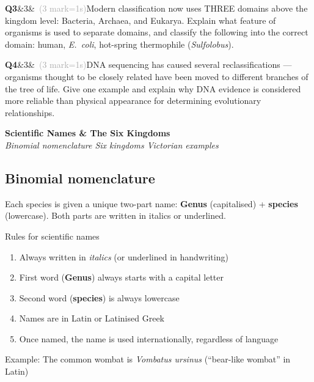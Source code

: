 \documentclass[11pt,a4paper]{article}
\newcommand{\sectiondiv}[3]{%
  \needspace{5\baselineskip}
  \begin{tcolorbox}[
    enhanced, breakable=false, arc=3.5mm,
    colback=ForestDark, colframe=ForestDark, boxrule=0pt,
    sidebyside, sidebyside align=center,
    lefthand width=2.0cm,
    left=2mm, right=4mm, top=4mm, bottom=4mm
  ]
    \begin{center}
      \label{sec:#1}%
      {\headingfont\bfseries\color{Forest!35!ForestDark}\fontsize{50}{50}\selectfont #1}
    \end{center}
    \tcblower
    {\headingfont\bfseries\color{white}\LARGE #2}\\[3pt]
    {\itshape\color{white!75!ForestDark}\small #3}
  \end{tcolorbox}%
}
\newcommand{\answerbox}[1]{%
  \begin{tcolorbox}[
    enhanced, breakable, arc=2mm,
    colback=Paper, colframe=Line,
    left=2mm, right=2mm, top=1mm, bottom=1mm,
    boxrule=1pt,
    height=#1
  ]
  \end{tcolorbox}%
}
\newcommand{\question}[3]{%
  \needspace{3\baselineskip}%
  \medskip
  \noindent\textbf{Q#1}\ifx&#2&\else\ \textcolor{DarkGrey}{(#2 mark\ifnum#2=1\else s\fi)}\fi\quad #3%
  \medskip
}
\begin{document}
\begin{yr8box}
\question{3}{3}{Modern classification now uses THREE domains above the kingdom level: Bacteria, Archaea, and Eukarya. Explain what feature of organisms is used to separate domains, and classify the following into the correct domain: human, \textit{E.\ coli}, hot-spring thermophile (\textit{Sulfolobus}).}
\answerbox{3.5cm}

\question{4}{3}{DNA sequencing has caused several reclassifications --- organisms thought to be closely related have been moved to different branches of the tree of life. Give one example and explain why DNA evidence is considered more reliable than physical appearance for determining evolutionary relationships.}
\answerbox{4cm}
\end{yr8box}

\newpage

\sectiondiv{3}{Scientific Names \& The Six Kingdoms}{Binomial nomenclature \textbullet{} Six kingdoms \textbullet{} Victorian examples}

\subsection{Binomial nomenclature}

Each species is given a unique two-part name: \textbf{Genus} (capitalised) + \textbf{species} (lowercase). Both parts are written in italics or underlined.

\begin{infobox}{Rules for scientific names}
\begin{enumerate}[itemsep=2pt]
  \item Always written in \textit{italics} (or underlined in handwriting)
  \item First word (\textbf{Genus}) always starts with a capital letter
  \item Second word (\textbf{species}) is always lowercase
  \item Names are in Latin or Latinised Greek
  \item Once named, the name is used internationally, regardless of language
\end{enumerate}
Example: The common wombat is \textit{Vombatus ursinus} (``bear-like wombat'' in Latin)
\end{infobox}
\end{document}
